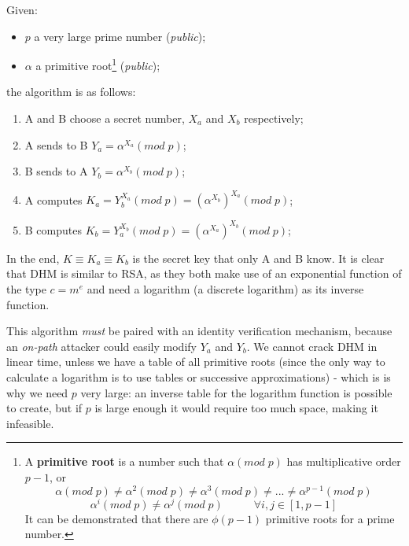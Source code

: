 Given:

\begin{itemize}
    \item $p$ a very large prime number (\textit{public});
    \item $\alpha$ a primitive root\footnote{
        A \textbf{primitive root} is a number such that $\alpha (mod\; p)$ has multiplicative order $p-1$, or
            \begin{equation*}
                \alpha (mod\; p) \neq \alpha^2 (mod\; p) \neq \alpha^3 (mod\; p) \neq ... \neq \alpha^{p-1} (mod\; p)
            \end{equation*}
            \begin{equation}
                \alpha^i (mod\; p) \neq \alpha^j (mod\; p) \;\;\;\;\;\;\;\;\;\; \forall i,j \in [1, p-1]
            \end{equation}
        It can be demonstrated that there are $\phi(p-1)$ primitive roots for a prime number.
        }  (\textit{public});
\end{itemize}

the algorithm is as follows:

\begin{enumerate}
    \item A and B choose a secret number, $X_a$ and $X_b$ respectively;
    \item A sends to B $Y_a = \alpha^{X_a} (mod\; p)$;
    \item B sends to A $Y_b = \alpha^{X_b} (mod\; p)$;
    \item A computes $K_a = Y_{b}^{X_a} (mod\; p) = (\alpha^{X_b})^{X_a} (mod\; p)$;
    \item B computes $K_b = Y_{a}^{X_b} (mod\; p) = (\alpha^{X_a})^{X_b} (mod\; p)$;
\end{enumerate}

In the end, $K \equiv K_a \equiv K_b$ is the secret key that only A and B know. It is clear that DHM is similar to RSA, as they both make use of an exponential function of the type $c=m^e$ and need a logarithm (a discrete logarithm) as its inverse function.

This algorithm \textit{must} be paired with an identity verification mechanism, because an \textit{on-path} attacker could easily modify $Y_a$ and $Y_b$. We cannot crack DHM in linear time, unless we have a table of all primitive roots (since the only way to calculate a logarithm is to use tables or successive approximations) - which is is why we need $p$ very large: an inverse table for the logarithm function is possible to create, but if $p$ is large enough it would require too much space, making it infeasible.

